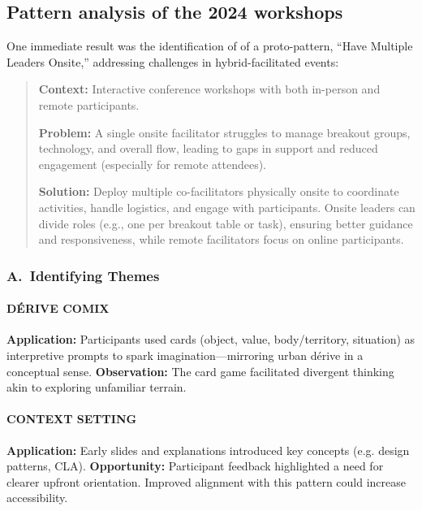 \documentclass[acmlarge,timestamp]{acmart}
\begin{document}
{\subsection*{Pattern analysis of the 2024 workshops}

One immediate result was the identification of of a proto-pattern,
“Have Multiple Leaders Onsite,” addressing challenges in
hybrid-facilitated events:

\begin{quote}
\textbf{Context:} Interactive conference workshops with both in-person and
remote participants.

\textbf{Problem:} A single onsite facilitator struggles to manage breakout
groups, technology, and overall flow, leading to gaps in support and
reduced engagement (especially for remote attendees).

\textbf{Solution:} Deploy multiple co-facilitators physically onsite to
coordinate activities, handle logistics, and engage with
participants. Onsite leaders can divide roles (e.g., one per breakout
table or task), ensuring better guidance and responsiveness, while
remote facilitators focus on online participants.
\end{quote}


\medskip

\subsubsection*{A.~Identifying Themes}

\paragraph*{DÉRIVE COMIX}

\noindent \textbf{Application:} Participants used cards (object, value, body/territory, situation) as interpretive prompts to spark imagination—mirroring  urban dérive in a conceptual sense. \textbf{Observation:} The card game facilitated divergent thinking akin to exploring unfamiliar terrain.

\paragraph*{CONTEXT SETTING}

\noindent \textbf{Application:} Early slides and explanations introduced key concepts (e.g. design patterns, CLA). \textbf{Opportunity:} Participant feedback highlighted a need for clearer upfront orientation. Improved alignment with this pattern could increase accessibility.

}
\end{document}
